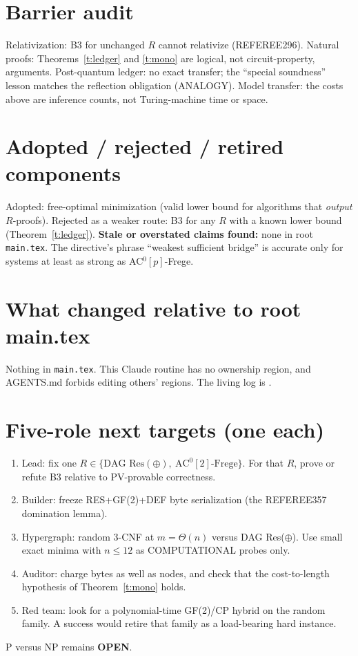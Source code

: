 \documentclass[11pt]{article}
\begin{document}
\section{Barrier audit}
Relativization: B3 for unchanged $R$ cannot relativize (REFEREE296). Natural proofs:
Theorems~\ref{t:ledger} and \ref{t:mono} are logical, not circuit-property, arguments.
Post-quantum ledger: no exact transfer; the ``special soundness'' lesson matches the
reflection obligation (ANALOGY). Model transfer: the costs above are inference counts, not
Turing-machine time or space.

\section{Adopted / rejected / retired components}
Adopted: free-optimal minimization (valid lower bound for algorithms that \emph{output} $R$-proofs).
Rejected as a weaker route: B3 for any $R$ with a known lower bound (Theorem~\ref{t:ledger}).
\textbf{Stale or overstated claims found:} none in root \texttt{main.tex}. The directive's
phrase ``weakest sufficient bridge'' is accurate only for systems at least as strong as
AC$^0[p]$-Frege.

\section{What changed relative to root main.tex}
Nothing in \texttt{main.tex}. This Claude routine has no ownership region, and AGENTS.md
forbids editing others' regions. The living log is
.

\section{Five-role next targets (one each)}
\begin{enumerate}
\item Lead: fix one $R\in\{\text{DAG Res}(\oplus),\ \text{AC}^0[2]\text{-Frege}\}$. For that $R$,
prove or refute B3 relative to PV-provable correctness.
\item Builder: freeze RES+GF(2)+DEF byte serialization (the REFEREE357 domination lemma).
\item Hypergraph: random 3-CNF at $m=\Theta(n)$ versus DAG Res($\oplus$). Use small exact
minima with $n\le 12$ as COMPUTATIONAL probes only.
\item Auditor: charge bytes as well as nodes, and check that the cost-to-length hypothesis of Theorem~\ref{t:mono} holds.
\item Red team: look for a polynomial-time GF(2)/CP hybrid on the random family. A success
would retire that family as a load-bearing hard instance.
\end{enumerate}
\noindent P versus NP remains \textbf{OPEN}.
\end{document}
